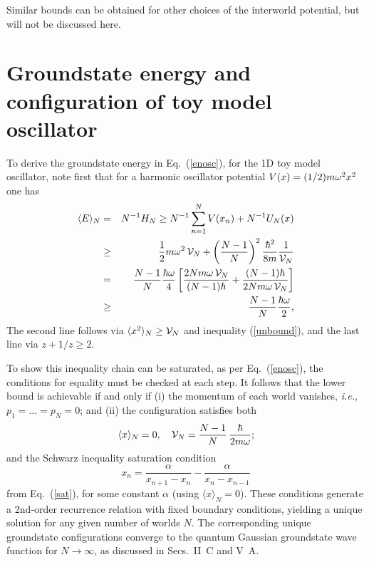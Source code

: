 \documentclass[twocolumn,aps,pra,amsmath,amssymb,superscriptaddress]{revtex4}
\newcommand{\ie}{{\em i.e.}}
\newcommand{\beq}{\begin{equation}}
\newcommand{\eeq}{\end{equation}}
\newcommand{\bqa}{\begin{eqnarray}}
\newcommand{\eqa}{\end{eqnarray}}
\newcommand{\nn}{\nonumber}
\renewcommand{\(}{\left(}
\renewcommand{\)}{\right)}
\newcommand{\blk}{\color{black}}
\newcommand{\grn}{\color{ngreen}}
\renewcommand\grn{\blk}
\begin{document}
{Similar bounds can be obtained for other choices of the interworld potential, but will not be discussed here.



\section{Groundstate energy and configuration of toy model
oscillator}\label{apx:groundstates}

To derive the groundstate energy in Eq.~(\ref{enosc}), for the 1D toy model oscillator, note first that for a harmonic oscillator potential $V(x)=(1/2)m\omega^2 \blk x^2$  one has
\bqa \nn
\langle E\rangle_N &=& N^{-1}H_N \geq  N^{-1} \sum_{n=1}^N V(x_n) + N^{-1} U_N(x)\\
\nn &\geq&  \frac{1}{2} m\omega^2\, {\blk {\cal V}_N} + \left(\frac{N-1}{N}\right)^2 \frac{\hbar^2}{8m}\frac{1}{\blk {\cal V}_N}\\
\nn &=& \frac{N-1}{N} \frac{\hbar\omega}{4} \left[ \frac{2Nm\omega\,{\blk {\cal V}_N}}{(N-1)\hbar}  +   \frac{(N-1)\hbar}{2Nm\omega\,{\blk {\cal V}_N}} \right]\\
\nn &\geq& \frac{N-1}{N} \frac{\hbar\omega}{2},
\eqa
The second line follows via $\langle \blk x^2 \blk\rangle_N\geq \blk {\cal V}_N$ and inequality (\ref{unbound}), and the last line via $z+1/z\geq 2$. 

To show this inequality chain can be saturated, as per Eq.~(\ref{enosc}), the conditions for equality must be checked at each step.  It follows that the lower bound is achievable if and only if (i) the momentum of each world vanishes, \ie, $p_1=\dots=p_N=0$; and (ii) the configuration satisfies both
\beq \label{cond}
\langle x \rangle_N=0,~~~ {\blk {\cal V}_N} = \frac{N-1}{N}\, \frac{\hbar}{2m\omega} ; \eeq
and the Schwarz inequality saturation condition \label{schwarz}
\begin{equation} \label{recur}
x_n = \frac{\alpha}{x_{n+1} - x_n} - \frac{\alpha}{x_{n} - x_{n-1}} 
\end{equation}
from Eq.~(\ref{sat}), for some constant $\alpha$ (using $\langle x
\rangle_N=0$).  These conditions generate a 2nd-order recurrence relation with
fixed boundary conditions, yielding a unique solution for any given number of
worlds $N$. The corresponding unique groundstate configurations converge to the
quantum Gaussian groundstate wave function for $N\to\infty$, as discussed in
\grn Secs.~II~C and \blk V~A.

}
\end{document}
